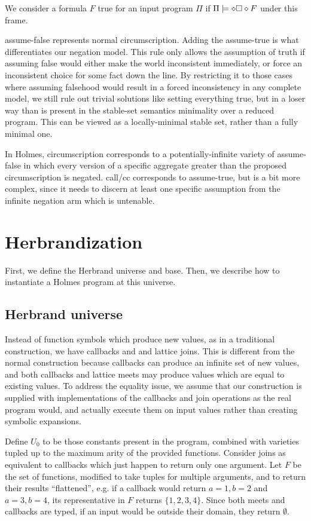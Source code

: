 We consider a formula $F$ true for an input program $\Pi$ if $\Pi \models \diamond \square \diamond F$ under this frame.

assume-false represents normal circumscription.
Adding the assume-true is what differentiates our negation model.
This rule only allows the assumption of truth if assuming false would either make the world inconsistent immediately, or force an inconsistent choice for some fact down the line.
By restricting it to those cases where assuming falsehood would result in a forced inconsistency in any complete model, we still rule out trivial solutions like setting everything true, but in a loser way than is present in the stable-set semantics minimality over a reduced program.
This can be viewed as a locally-minimal stable set, rather than a fully minimal one.

In Holmes, circumscription corresponds to a potentially-infinite variety of assume-false in which every version of a specific aggregate greater than the proposed circumscription is negated.
call/cc corresponds to assume-true, but is a bit more complex, since it needs to discern at least one specific assumption from the infinite negation arm which is untenable.

\section{Herbrandization}
\label{formal:sec:herbrand}
First, we define the Herbrand universe and base.
Then, we describe how to instantiate a Holmes program at this universe.

\subsection{Herbrand universe}
Instead of function symbols which produce new values, as in a traditional construction, we have callbacks and and lattice joins.
This is different from the normal construction because callbacks can produce an infinite set of new values, and both callbacks and lattice meets may produce values which are equal to existing values.
To address the equality issue, we assume that our construction is supplied with implementations of the callbacks and join operations as the real program would, and actually execute them on input values rather than creating symbolic expansions.

Define $U_0$ to be those constants present in the program, combined with varieties tupled up to the maximum arity of the provided functions.
Consider joins as equivalent to callbacks which just happen to return only one argument.
Let $F$ be the set of functions, modified to take tuples for multiple arguments, and to return their results ``flattened'', e.g. if a callback would return $a = 1, b = 2$ and $a = 3, b = 4$, its representative in $F$ returns $\{1, 2, 3, 4\}$.
Since both meets and callbacks are typed, if an input would be outside their domain, they return $\emptyset$.

